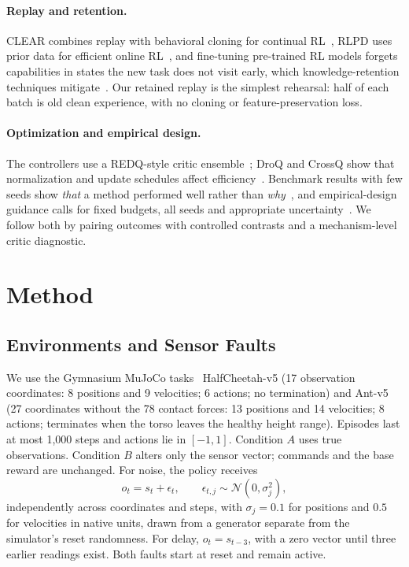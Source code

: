 \documentclass[runningheads]{llncs}
\begin{document}
\paragraph{Replay and retention.} CLEAR combines replay with behavioral cloning for continual RL~\cite{clear}, RLPD uses prior data for efficient online RL~\cite{rlpd}, and fine-tuning pre-trained RL models forgets capabilities in states the new task does not visit early, which knowledge-retention techniques mitigate~\cite{finetuneforget}. Our retained replay is the simplest rehearsal: half of each batch is old clean experience, with no cloning or feature-preservation loss.

\paragraph{Optimization and empirical design.} The controllers use a REDQ-style critic ensemble~\cite{redq}; DroQ and CrossQ show that normalization and update schedules affect efficiency~\cite{droq,crossq}. Benchmark results with few seeds show \emph{that} a method performed well rather than \emph{why}~\cite{benchmarking}, and empirical-design guidance calls for fixed budgets, all seeds and appropriate uncertainty~\cite{empirical}. We follow both by pairing outcomes with controlled contrasts and a mechanism-level critic diagnostic.

\section{Method}
\subsection{Environments and Sensor Faults}
We use the Gymnasium MuJoCo tasks~\cite{gym} HalfCheetah-v5 (17 observation coordinates: 8 positions and 9 velocities; 6 actions; no termination) and Ant-v5 (27 coordinates without the 78 contact forces: 13 positions and 14 velocities; 8 actions; terminates when the torso leaves the healthy height range). Episodes last at most 1,000 steps and actions lie in $[-1,1]$. Condition $A$ uses true observations. Condition $B$ alters only the sensor vector; commands and the base reward are unchanged. For noise, the policy receives
\begin{equation}
 o_t=s_t+\epsilon_t,\qquad \epsilon_{t,j}\sim\mathcal{N}(0,\sigma_j^2),
\end{equation}
independently across coordinates and steps, with $\sigma_j=0.1$ for positions and $0.5$ for velocities in native units, drawn from a generator separate from the simulator's reset randomness. For delay, $o_t=s_{t-3}$, with a zero vector until three earlier readings exist. Both faults start at reset and remain active.
\end{document}

